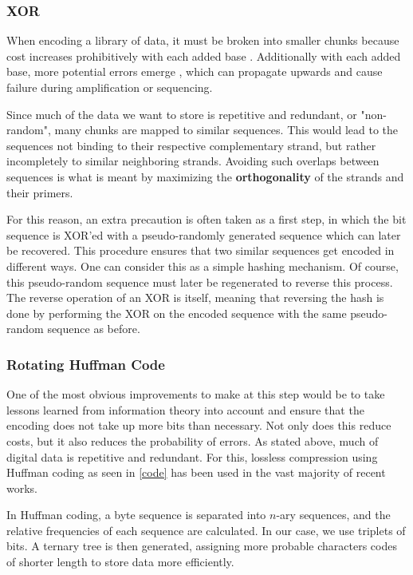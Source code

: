 \documentclass[a4paper,conference]{IEEEtran}
\begin{document}
\subsubsection{XOR}
When encoding a library of data, it must be broken into smaller chunks because cost increases prohibitively with each added base \cite{}. Additionally with each added base, more potential errors emerge \cite{}, which can propagate upwards and cause failure during amplification or sequencing.

Since much of the data we want to store is repetitive and redundant, or "non-random", many chunks are mapped to similar sequences. This would lead to the sequences not binding to their respective complementary strand, but rather incompletely to similar neighboring strands. Avoiding such overlaps between sequences is what is meant by maximizing the \textbf{orthogonality} of the strands and their primers.

For this reason, an extra precaution is often taken as a first step, in which the bit sequence is XOR'ed with a pseudo-randomly generated sequence which can later be recovered. This procedure ensures that two similar sequences get encoded in different ways. One can consider this as a simple hashing mechanism. Of course, this pseudo-random sequence must later be regenerated to reverse this process. The reverse operation of an XOR is itself, meaning that reversing the hash is done by performing the XOR on the encoded sequence with the same pseudo-random sequence as before.


\subsubsection{Rotating Huffman Code}
One of the most obvious improvements to make at this step would be to take lessons learned from information theory into account and ensure that the encoding does not take up more bits than necessary. Not only does this reduce costs, but it also reduces the probability of errors. As stated above, much of digital data is repetitive and redundant. For this, lossless compression using Huffman coding \cite{huffmancode} as seen in \ref{code} has been used in the vast majority of recent works.

In Huffman coding, a byte sequence is separated into $n$-ary sequences, and the relative frequencies of each sequence are calculated. In our case, we use triplets of bits. A ternary tree is then generated, assigning more probable characters codes of shorter length to store data more efficiently.
\end{document}
